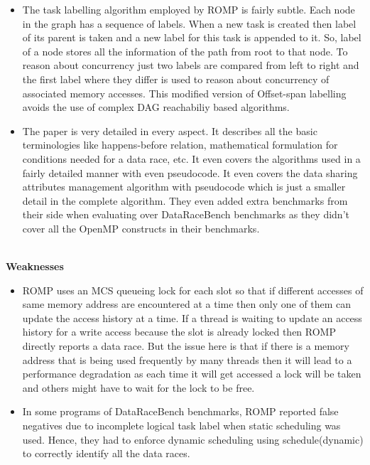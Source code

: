 \documentclass[20pt]{letter}
\begin{document}
\begin{enumerate}
{\begin{itemize}
    \item The task labelling algorithm employed by ROMP is fairly subtle. Each node in the graph has a sequence of labels. When a new task is created then label of its parent is taken and a new label for this task is appended to it. So, label of a node stores all the information of the path from root to that node. To reason about concurrency just two labels are compared from left to right and the first label where they differ is used to reason about concurrency of associated memory accesses. This modified version of Offset-span labelling avoids the use of complex DAG reachabiliy based algorithms.\\

    \item The paper is very detailed in every aspect. It describes all the basic terminologies like happens-before relation, mathematical formulation for conditions needed for a data race, etc. It even covers the algorithms used in a fairly detailed manner with even pseudocode. It even covers the data sharing attributes management algorithm with pseudocode which is just a smaller detail in the complete algorithm. They even added extra benchmarks from their side when evaluating over DataRaceBench benchmarks as they didn't cover all the OpenMP constructs in their benchmarks. 
\end{itemize}

\textbf{\\Weaknesses}\\
\begin{itemize}
    \item ROMP uses an MCS queueing lock for each slot so that if different accesses of same memory address are encountered at a time then only one of them can update the access history at a time. If a thread is waiting to update an access history for a write access because the slot is already locked then ROMP directly reports a data race. But the issue here is that if there is a memory address that is being used frequently by many threads then it will lead to a performance degradation as each time it will get accessed a lock will be taken and others might have to wait for the lock to be free.\\
    
    \item In some programs of DataRaceBench benchmarks, ROMP reported false negatives due to incomplete logical task label when static scheduling was used. Hence, they had to enforce dynamic scheduling using schedule(dynamic) to correctly identify all the data races.\\ 


\end{itemize}}
\end{enumerate}
\end{document}
